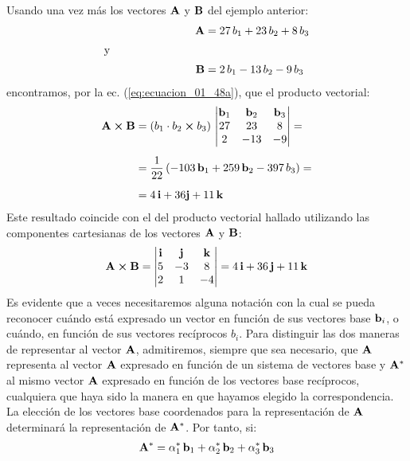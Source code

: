 \documentclass[12pt]{article}
\begin{document}
Usando una vez más los vectores $\vb{A}$ y $\vb{B}$ del ejemplo anterior:
\begin{align*}
    \vb{A} &= 27 \, b_{1} + 23 \, b_{2} + 8 \, b_{3} \\[0.25em]
    \text{y} \hspace{3cm} &{} \\[0.25em]
    \vb{B} &= 2 \, b_{1} - 13 \, b_{2} - 9 \, b_{3}
\end{align*}
encontramos, por la ec. (\ref{eq:ecuacion_01_48a}), que el producto vectorial:
\begin{eqnarray*}
\begin{aligned}
\vb{A} \cp \vb{B} &= \left( b_{1} \cdot b_{2} \cp b_{3} \right) \, \mdet{
    \vb{b}_{1} & \vb{b}_{2} & \vb{b}_{3} \\
    27 & 23 & 8 \\
    2 & -13 & -9
} = \\[0.5em]
&= \dfrac{1}{22} \left( -103 \, \vb{b}_{1} + 259 \, \vb{b}_{2} - 397 \, b_{3} \right) = \\[0.5em]
&= 4 \, \vb{i} + 36 \vb{j} + 11 \, \vb{k}
\end{aligned}
\end{eqnarray*}
Este resultado coincide con el del producto vectorial hallado utilizando las componentes cartesianas de los vectores $\vb{A}$ y $\vb{B}$:
\begin{align*}
    \vb{A} \cp \vb{B} = \mdet{
        \vb{i} & \vb{j} & \vb{k} \\
        5 & -3 & 8 \\
        2 & 1 & -4
    } = 4 \, \vb{i} + 36 \, \vb{j} + 11 \, \vb{k}
\end{align*}
Es evidente que a veces necesitaremos alguna notación con la cual se pueda reconocer cuándo está expresado un vector en función de sus vectores base $\vb{b}_{i}$, o cuándo, en función de sus vectores recíprocos $b_{i}$. Para distinguir las dos maneras de representar al vector $\vb{A}$, admitiremos, siempre que sea necesario, que $\vb{A}$ representa al vector $\vb{A}$ expresado en función de un sistema de vectores base y $\vb{A}^{*}$ al mismo vector $\vb{A}$ expresado en función de los vectores base recíprocos, cualquiera que haya sido la manera en que hayamos elegido la correspondencia. La elección de los vectores base coordenados para la representación de $\vb{A}$ determinará la representación de $\vb{A}^{*}$. Por tanto, si:
\begin{align}
    \vb{A}^{*} = \alpha_{1}^{*} \, \vb{b}_{1} + \alpha_{2}^{*} \, \vb{b}_{2} + \alpha_{3}^{*} \, \vb{b}_{3}
    \label{eq:ecuacion_01_49}
\end{align}
\end{document}
